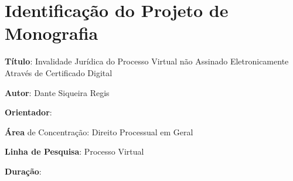 \chapter{Identificação do Projeto de Monografia}

\textbf{Título}: Invalidade Jurídica do Processo Virtual não Assinado Eletronicamente Através de Certificado Digital\par
\textbf{Autor}: Dante Siqueira Regis\par
\textbf{Orientador}: \par
\textbf{Área }de Concentração: Direito Processual em Geral\par
\textbf{Linha de Pesquisa}: Processo Virtual\par
\textbf{Duração}: 

